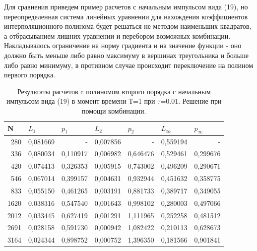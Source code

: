 \documentclass[14pt]{article}
\begin{document}
\indent Для сравнения приведем пример расчетов с начальным импульсом вида (19), но переопределенная система линейных уравнении для нахождения коэффициентов интерполяционного полинома будет решаться не методом наименьших квадратов, а отбрасыванием лишних уравнении и перебором возможных комбинации. Накладывалось ограничение на норму градиента и на значение функции - оно должно быть меньше либо равно максимуму в вершинах треугольника и больше либо равно минимуму, в противном случае происходит переключение на полином первого порядка.

\begin{table}[H]
\caption{Результаты расчетов c полиномом второго порядка с начальным импульсом вида (19) в момент времени Т=1 при $\tau$=0.01. Решение при помощи комбинации.}
\begin{tabular}{|r|l|l|l|l|l|l|}
\hline
\multicolumn{1}{|l|}{N} & \multicolumn{1}{l|}{$L_1$}        & \multicolumn{1}{l|}{$p_1$} & \multicolumn{1}{l|}{$L_2$}     & \multicolumn{1}{l|}{$p_2$} & \multicolumn{1}{l|}{$L_\infty$} & \multicolumn{1}{l|}{$p_\infty$} \\ \hline
280                         & 0,081669 & \multicolumn{1}{r|}{-} & 0,007856 & \multicolumn{1}{r|}{-}        & 0,559194 & \multicolumn{1}{r|}{-} \\ \hline
336                         & 0,080034 & 0,110917               & 0,006982 & 0,646476 & 0,529461 & 0,299676               \\ \hline
420                         & 0,074413 & 0,326353               & 0,005915 & 0,743002 & 0,496209 & 0,290671               \\ \hline
546                         & 0,067014 & 0,399157               & 0,004631 & 0,932944 & 0,451632 & 0,358775               \\ \hline
833                         & 0,055150 & 0,461265               & 0,003191 & 0,881733 & 0,389717 & 0,349055               \\ \hline
1620                        & 0,038316 & 0,547540               & 0,001643 & 0,998102 & 0,280003 & 0,497066               \\ \hline
2012                        & 0,033445 & 0,627419               & 0,001291 & 1,111965 & 0,252258 & 0,481512               \\ \hline
2691                        & 0,028158 & 0,591730               & 0,000942 & 1,082422 & 0,210113 & 0,628673               \\ \hline
3164                        & 0,024344 & 0,898752               & 0,000752 & 1,396350 & 0,181566 & 0,901841               \\ \hline

\end{tabular}
\end{table}
\end{document}
